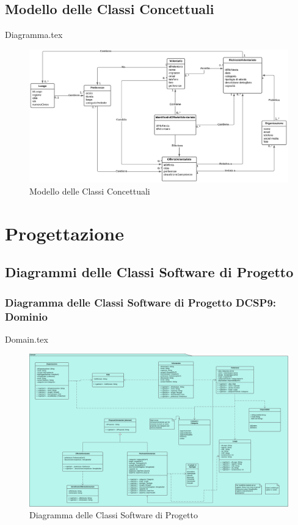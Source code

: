 \documentclass[12pt]{article}
\begin{document}
\subsection{Modello delle Classi Concettuali}
{Diagramma.tex}
\begin{figure}[H]
    \includegraphics[width=1.17\textwidth, height=\textheight,keepaspectratio]{Immagini/ModellazioneDiBusiness/Iterazione 2/Diagramma.png}
        \caption{Modello delle Classi Concettuali}
        \label{fig:Modello delle Classi Concettuali 2}
\end{figure}

\section{Progettazione}

\subsection{Diagrammi delle Classi Software di Progetto}

\subsubsection{Diagramma delle Classi Software di Progetto DCSP9: Dominio}
{Domain.tex}

\begin{figure}[H]
    \includegraphics[width=\textwidth, height=\textheight,keepaspectratio]{Immagini/DCSP/Iterazione 2/DCSPDomain.png}
        \caption{Diagramma delle Classi Software di Progetto}
        \label{fig:diagrammaDCSP9}
\end{figure}
\end{document}
